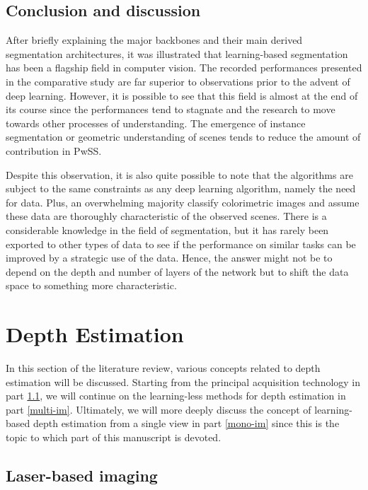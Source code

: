 \subsection{Conclusion and discussion}\label{seg4}

After briefly explaining the major backbones and their main derived segmentation architectures, it was illustrated that learning-based segmentation has been a flagship field in computer vision. The recorded performances presented in the comparative study are far superior to observations prior to the advent of deep learning. However, it is possible to see that this field is almost at the end of its course since the performances tend to stagnate and the research to move towards other processes of understanding. The emergence of instance segmentation or geometric understanding of scenes tends to reduce the amount of contribution in PwSS.

Despite this observation, it is also quite possible to note that the algorithms are subject to the same constraints as any deep learning algorithm, namely the need for data. Plus, an overwhelming majority classify colorimetric images and assume these data are thoroughly characteristic of the observed scenes. There is a considerable knowledge in the field of segmentation, but it has rarely been exported to other types of data to see if the performance on similar tasks can be improved by a strategic use of the data.
Hence, the answer might not be to depend on the depth and number of layers of the network but to shift the data space to something more characteristic. 
\pagebreak
\section{Depth Estimation}\label{soa-de}

In this section of the literature review, various concepts related to depth estimation will be discussed. Starting from the principal acquisition technology in part \ref{depth-acqu}, we will continue on the learning-less methods for depth estimation in part \ref{multi-im}.
Ultimately, we will more deeply discuss the concept of learning-based depth estimation from a single view in part \ref{mono-im} since this is the topic to which part of this manuscript is devoted.


\subsection{Laser-based imaging}\label{depth-acqu}

